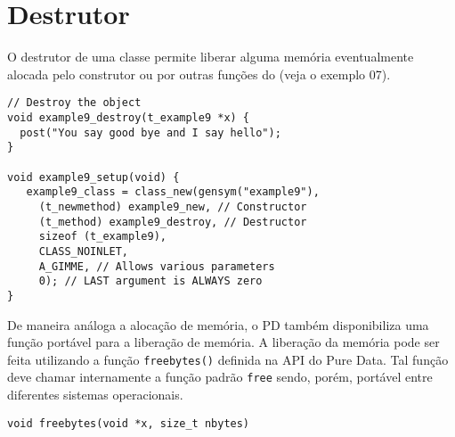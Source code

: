 \section{Destrutor}

O destrutor de uma classe permite liberar alguma memória eventualmente alocada
pelo construtor ou por outras funções do \external (veja o exemplo 07).

\begin{lstlisting}[caption=Exemplo de destrutor]
// Destroy the object
void example9_destroy(t_example9 *x) {
  post("You say good bye and I say hello");
}

void example9_setup(void) {
   example9_class = class_new(gensym("example9"),
     (t_newmethod) example9_new, // Constructor
     (t_method) example9_destroy, // Destructor
     sizeof (t_example9),
     CLASS_NOINLET,
     A_GIMME, // Allows various parameters
     0); // LAST argument is ALWAYS zero
}
\end{lstlisting}

De maneira análoga a alocação de memória, o PD também disponibiliza uma função
portável para a liberação de memória.
A liberação da memória pode ser feita utilizando a função \texttt{freebytes()}
definida na API do Pure Data.
Tal função deve chamar internamente a função padrão \texttt{free} sendo, porém,
portável entre diferentes sistemas operacionais.

\begin{lstlisting}
void freebytes(void *x, size_t nbytes)
\end{lstlisting}
